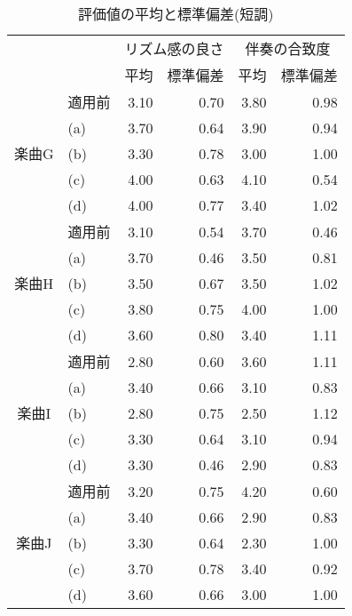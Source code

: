 \begin{table}[h]
  \caption{評価値の平均と標準偏差(短調)}
  \label{tab:question_tan}
  \centering
  \begin{tabular}{|c|l|r|r|r|r|} \hline
      \multicolumn{2}{|c|}{} & \multicolumn{2}{|c|}{リズム感の良さ} &  \multicolumn{2}{|c|}{伴奏の合致度}   \\ \cline{3-6}
      \multicolumn{2}{|c|}{} & 平均 & 標準偏差 & 平均 & 標準偏差 \\ \hline

      \multirow{5}{*}{楽曲G}  & 適用前 & 3.10  & 0.70  & 3.80  & 0.98 \\ \cline{2-6}
      & (a) & 3.70  & 0.64  & 3.90  & 0.94 \\ \cline{2-6}
      & (b) & 3.30  & 0.78  & 3.00  & 1.00 \\ \cline{2-6}
      & (c) & 4.00  & 0.63  & 4.10  & 0.54 \\ \cline{2-6}
      & (d) & 4.00  & 0.77  & 3.40  & 1.02 \\ \cline{1-6}

      \multirow{5}{*}{楽曲H}  & 適用前 & 3.10  & 0.54  & 3.70  & 0.46 \\ \cline{2-6}
      & (a) & 3.70  & 0.46  & 3.50  & 0.81 \\ \cline{2-6}
      & (b) & 3.50  & 0.67  & 3.50  & 1.02 \\ \cline{2-6}
      & (c) & 3.80  & 0.75  & 4.00  & 1.00 \\ \cline{2-6}
      & (d) & 3.60  & 0.80  & 3.40  & 1.11 \\ \cline{1-6}

      \multirow{5}{*}{楽曲I}  & 適用前 & 2.80  & 0.60  & 3.60  & 1.11 \\ \cline{2-6}
      & (a) & 3.40  & 0.66  & 3.10  & 0.83 \\ \cline{2-6}
      & (b) & 2.80  & 0.75  & 2.50  & 1.12 \\ \cline{2-6}
      & (c) & 3.30  & 0.64  & 3.10  & 0.94 \\ \cline{2-6}
      & (d) & 3.30  & 0.46  & 2.90  & 0.83 \\ \cline{1-6}

      \multirow{5}{*}{楽曲J}  & 適用前 & 3.20  & 0.75  & 4.20  & 0.60 \\ \cline{2-6}
      & (a) & 3.40  & 0.66  & 2.90  & 0.83 \\ \cline{2-6}
      & (b) & 3.30  & 0.64  & 2.30  & 1.00 \\ \cline{2-6}
      & (c) & 3.70  & 0.78  & 3.40  & 0.92 \\ \cline{2-6}
      & (d) & 3.60  & 0.66  & 3.00  & 1.00 \\ \cline{1-6}


\end{tabular}
\end{table}
